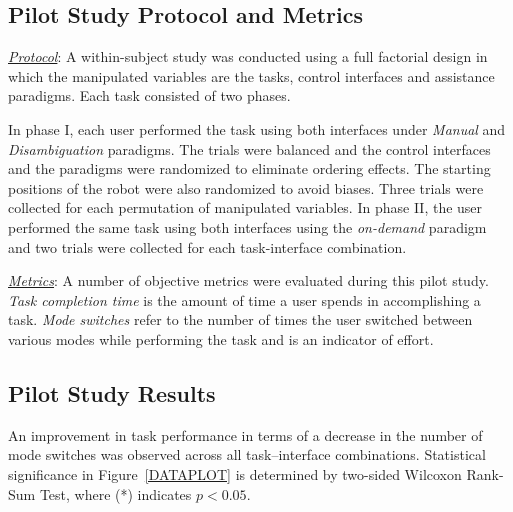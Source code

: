 \documentclass[conference]{IEEEtran}
\begin{document}
\subsection{Pilot Study Protocol and Metrics}

\noindent\underline{\textit{Protocol}}:
A within-subject study was conducted using a full factorial design in which the manipulated variables are the tasks, control interfaces and assistance paradigms. Each task consisted of two phases. 

In phase I, each user performed the task using both interfaces under \textit{Manual} and \textit{Disambiguation} paradigms. The trials were balanced and the control interfaces and the paradigms were randomized to eliminate ordering effects. The starting positions of the robot were also randomized to avoid biases. Three trials were collected for each permutation of manipulated variables. 
In phase II, the user performed the same task using both interfaces using the \textit{on-demand} paradigm and two trials were collected for each task-interface combination.  

\noindent\underline{\textit{Metrics}}: A number of objective metrics were evaluated during this pilot study. \textit{Task completion time} is the amount of time a user spends in accomplishing a task. \textit{Mode switches} refer to the number of times the user switched between various modes while performing the task and is an indicator of effort. 


\subsection{Pilot Study Results}\label{RES}
An improvement in task performance in terms of a decrease in the number of mode switches was observed across all task--interface combinations. Statistical significance in Figure~\ref{DATAPLOT} is determined by two-sided Wilcoxon Rank-Sum Test, where (*) indicates $p < 0.05$.
\end{document}
